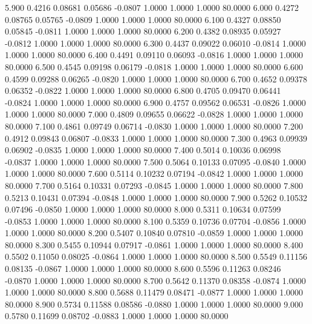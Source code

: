    5.900   0.4216   0.08681   0.05686  -0.0807   1.0000   1.0000   1.0000  80.0000
   6.000   0.4272   0.08765   0.05765  -0.0809   1.0000   1.0000   1.0000  80.0000
   6.100   0.4327   0.08850   0.05845  -0.0811   1.0000   1.0000   1.0000  80.0000
   6.200   0.4382   0.08935   0.05927  -0.0812   1.0000   1.0000   1.0000  80.0000
   6.300   0.4437   0.09022   0.06010  -0.0814   1.0000   1.0000   1.0000  80.0000
   6.400   0.4491   0.09110   0.06093  -0.0816   1.0000   1.0000   1.0000  80.0000
   6.500   0.4545   0.09198   0.06179  -0.0818   1.0000   1.0000   1.0000  80.0000
   6.600   0.4599   0.09288   0.06265  -0.0820   1.0000   1.0000   1.0000  80.0000
   6.700   0.4652   0.09378   0.06352  -0.0822   1.0000   1.0000   1.0000  80.0000
   6.800   0.4705   0.09470   0.06441  -0.0824   1.0000   1.0000   1.0000  80.0000
   6.900   0.4757   0.09562   0.06531  -0.0826   1.0000   1.0000   1.0000  80.0000
   7.000   0.4809   0.09655   0.06622  -0.0828   1.0000   1.0000   1.0000  80.0000
   7.100   0.4861   0.09749   0.06714  -0.0830   1.0000   1.0000   1.0000  80.0000
   7.200   0.4912   0.09843   0.06807  -0.0833   1.0000   1.0000   1.0000  80.0000
   7.300   0.4963   0.09939   0.06902  -0.0835   1.0000   1.0000   1.0000  80.0000
   7.400   0.5014   0.10036   0.06998  -0.0837   1.0000   1.0000   1.0000  80.0000
   7.500   0.5064   0.10133   0.07095  -0.0840   1.0000   1.0000   1.0000  80.0000
   7.600   0.5114   0.10232   0.07194  -0.0842   1.0000   1.0000   1.0000  80.0000
   7.700   0.5164   0.10331   0.07293  -0.0845   1.0000   1.0000   1.0000  80.0000
   7.800   0.5213   0.10431   0.07394  -0.0848   1.0000   1.0000   1.0000  80.0000
   7.900   0.5262   0.10532   0.07496  -0.0850   1.0000   1.0000   1.0000  80.0000
   8.000   0.5311   0.10634   0.07599  -0.0853   1.0000   1.0000   1.0000  80.0000
   8.100   0.5359   0.10736   0.07704  -0.0856   1.0000   1.0000   1.0000  80.0000
   8.200   0.5407   0.10840   0.07810  -0.0859   1.0000   1.0000   1.0000  80.0000
   8.300   0.5455   0.10944   0.07917  -0.0861   1.0000   1.0000   1.0000  80.0000
   8.400   0.5502   0.11050   0.08025  -0.0864   1.0000   1.0000   1.0000  80.0000
   8.500   0.5549   0.11156   0.08135  -0.0867   1.0000   1.0000   1.0000  80.0000
   8.600   0.5596   0.11263   0.08246  -0.0870   1.0000   1.0000   1.0000  80.0000
   8.700   0.5642   0.11370   0.08358  -0.0874   1.0000   1.0000   1.0000  80.0000
   8.800   0.5688   0.11479   0.08471  -0.0877   1.0000   1.0000   1.0000  80.0000
   8.900   0.5734   0.11588   0.08586  -0.0880   1.0000   1.0000   1.0000  80.0000
   9.000   0.5780   0.11699   0.08702  -0.0883   1.0000   1.0000   1.0000  80.0000
